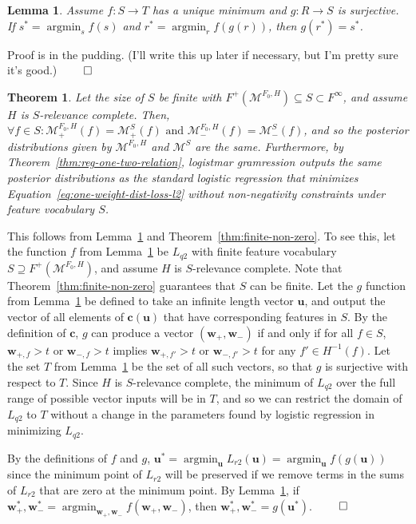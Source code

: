 \documentclass[11pt,letterpaper]{article}
\DeclareMathOperator*{\argmin}{argmin}
\newtheorem{theorem}{Theorem}[section]
\newtheorem{lemma}{Lemma}[section]
\begin{document}
\begin{lemma}
\label{lemma:argmin-comp}
Assume $f:S\rightarrow T$ has a unique minimum and 
$g:R\rightarrow S$ is surjective.  If
$s^*=\argmin_s f(s)$ and $r^*=\argmin_r f(g(r))$,
then $g(r^*)=s^*$.
\end{lemma}

Proof is in the pudding. (I'll write this up later
if necessary, but I'm pretty sure it's good.) $\qed$

\begin{theorem}
\label{thm:lr-lg-equiv}
Let the size of $S$ be finite with 
$F^+(\mathcal{M}^{F_0,H})\subseteq S \subset F^{\infty}$, and assume $H$ is 
$S$-relevance complete.  Then,
$\forall f\in S: 
\mathcal{M}^{F_0,H}_+(f)=
\mathcal{M}^{S}_+(f)\text{ 
and 
}\mathcal{M}^{F_0,H}_-(f)=\mathcal{M}^{S}_-(f)$, and so the posterior distributions
given by $\mathcal{M}^{F_0,H}$ and 
$\mathcal{M}^{S}$ are the same.
Furthermore, by Theorem~\ref{thm:reg-one-two-relation},
logistmar gramression outputs the same posterior
distributions as the standard logistic regression
that minimizes Equation~\ref{eq:one-weight-dist-loss-l2}
without non-negativity constraints under
feature vocabulary $S$. 
\end{theorem}

This follows from 
Lemma~\ref{lemma:argmin-comp} and 
Theorem~\ref{thm:finite-non-zero}.  To see this,
let the function $f$ from Lemma~\ref{lemma:argmin-comp} 
be $L_{q2}$ with finite feature vocabulary 
$S\supseteq F^+(\mathcal{M}^{F_0,H})$,
and assume $H$ is $S$-relevance complete.  
Note that Theorem~\ref{thm:finite-non-zero} 
guarantees that $S$ can be finite.
Let the $g$ function from 
Lemma~\ref{lemma:argmin-comp} be defined to take
an infinite length vector 
$\mathbf{u}$, and output the vector of all
elements of $\mathbf{c}(\mathbf{u})$ that
have corresponding features in $S$.  By the
definition of $\mathbf{c}$, $g$ can produce
a vector $(\mathbf{w}_+,\mathbf{w}_-)$ if and 
only if for all $f\in S$, $\mathbf{w}_{+,f}>t$
or $\mathbf{w}_{-,f}>t$ implies 
$\mathbf{w}_{+,f'}>t$ or $\mathbf{w}_{-,f'}>t$ 
for any $f'\in  H^{-1}(f)$.  Let the set
$T$ from Lemma~\ref{lemma:argmin-comp} be
the set of all such vectors, so that $g$ is
surjective with respect to $T$. Since $H$
is $S$-relevance complete, the minimum
of $L_{q2}$ over the full range of possible 
vector inputs 
will be in $T$, and so we can restrict
the domain of $L_{q2}$ to $T$ without a change
in the parameters found by logistic
regression in minimizing $L_{q2}$.  

By the definitions of $f$ and $g$, 
$\mathbf{u}^*=\argmin_{\mathbf{u}} L_{r2}(\mathbf{u})=
\argmin_{\mathbf{u}} f(g(\mathbf{u}))$ since
the minimum point of $L_{r2}$ will be preserved
if we remove terms in the sums of $L_{r2}$ 
that are zero at the minimum point. By 
Lemma~\ref{lemma:argmin-comp}, if 
$\mathbf{w}_+^*,\mathbf{w}_-^*=\argmin_{\mathbf{w}_+,\mathbf{w}_-}f(\mathbf{w}_+,\mathbf{w}_-)$, then 
$\mathbf{w}_+^*,\mathbf{w}_-^*=g(\mathbf{u^*})$.
 $\qed$
\end{document}
